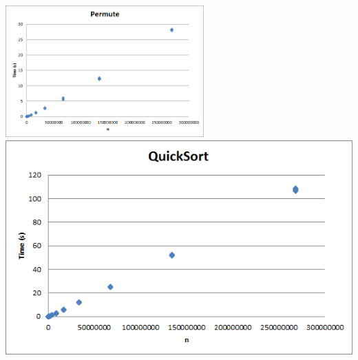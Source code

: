    \begin{center}
    \includegraphics[width=3in]{permute.png}
    \includegraphics[width=3	in]{quicksort.png}
   \end{center}
